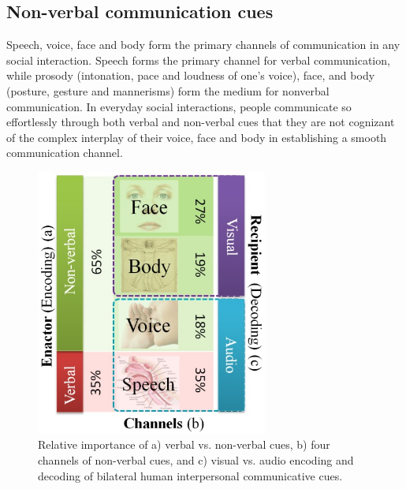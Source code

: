 \documentclass[oneside,11pt]{memoir}
\begin{document}
\subsection{Non-verbal communication cues}
Speech, voice, face and body form the primary channels of communication in any social interaction. Speech forms the primary channel for verbal communication, while prosody (intonation, pace and loudness of one's voice), face, and body (posture, gesture and mannerisms) form the medium for nonverbal communication. In everyday social interactions, people communicate so effortlessly through both verbal and non-verbal cues that they are not cognizant of the complex interplay of their voice, face and body in establishing a smooth communication channel.

\begin{figure}[h]
\begin{center}
 \includegraphics[width=3in]{NVCEncodings.jpg}
\end{center}
\caption{Relative importance of a) verbal vs. non-verbal cues, b) four channels of non-verbal cues, and c) visual vs. audio encoding and decoding of bilateral human interpersonal communicative cues.}
\label{Fig:Figure1}
\end{figure}
\end{document}
